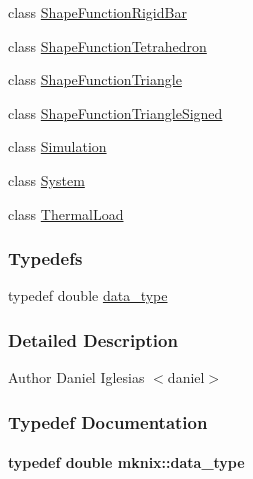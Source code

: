 \begin{DoxyCompactItemize}
class \hyperlink{classmknix_1_1_shape_function_rigid_bar}{Shape\-Function\-Rigid\-Bar}
\item 
class \hyperlink{classmknix_1_1_shape_function_tetrahedron}{Shape\-Function\-Tetrahedron}
\item 
class \hyperlink{classmknix_1_1_shape_function_triangle}{Shape\-Function\-Triangle}
\item 
class \hyperlink{classmknix_1_1_shape_function_triangle_signed}{Shape\-Function\-Triangle\-Signed}
\item 
class \hyperlink{classmknix_1_1_simulation}{Simulation}
\item 
class \hyperlink{classmknix_1_1_system}{System}
\item 
class \hyperlink{classmknix_1_1_thermal_load}{Thermal\-Load}
\end{DoxyCompactItemize}
\subsubsection*{Typedefs}
\begin{DoxyCompactItemize}
\item 
typedef double \hyperlink{namespacemknix_a16be4b246fbf2cceb141e3a179111020}{data\-\_\-type}
\end{DoxyCompactItemize}


\subsubsection{Detailed Description}
\begin{DoxyAuthor}{Author}
Daniel Iglesias $<$daniel$>$ 
\end{DoxyAuthor}


\subsubsection{Typedef Documentation}
\hypertarget{namespacemknix_a16be4b246fbf2cceb141e3a179111020}{
\paragraph[{data\-\_\-type}]{\setlength{\rightskip}{0pt plus 5cm}typedef double {\bf mknix\-::data\-\_\-type}}}\label{namespacemknix_a16be4b246fbf2cceb141e3a179111020}
